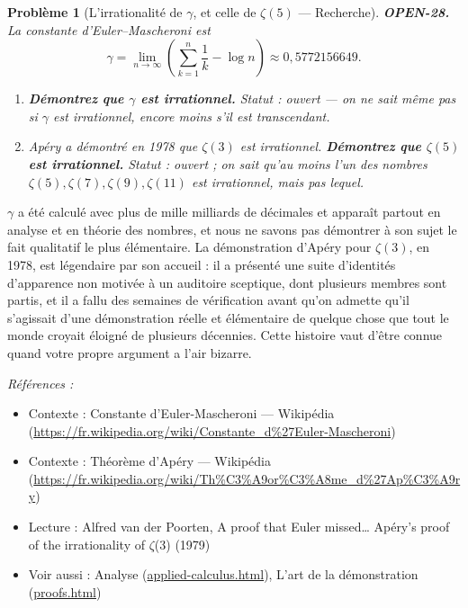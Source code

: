\documentclass[11pt]{article}
\newtheorem{problem}{Problème}
\newenvironment{refs}{\par\small\noindent\emph{Références :}\begin{itemize}\setlength\itemsep{0pt}}{\end{itemize}\normalsize}
\begin{document}
\bigskip

\begin{problem}[{L'irrationalité de $ \gamma $, et celle de $ \zeta(5) $ --- Recherche}]
\textbf{OPEN-28.} La constante d'Euler--Mascheroni est
\[ \gamma = \lim_{n \to \infty}\left( \sum_{k=1}^{n} \frac{1}{k} - \log n \right) \approx 0{,}5772156649 . \]
\begin{enumerate}
\item[(a)] \textbf{Démontrez que $ \gamma $ est irrationnel.} Statut : ouvert --- on ne sait même
pas si $ \gamma $ est irrationnel, encore moins s'il est transcendant.
\item[(b)] Apéry a démontré en 1978 que $ \zeta(3) $ est irrationnel. \textbf{Démontrez que
$ \zeta(5) $ est irrationnel.} Statut : ouvert ; on sait qu'au moins l'un des nombres
$ \zeta(5), \zeta(7), \zeta(9), \zeta(11) $ est irrationnel, mais pas lequel.
\end{enumerate}

\end{problem}

\noindent $ \gamma $ a été calculé avec plus de mille milliards de décimales et
apparaît partout en analyse et en théorie des nombres, et nous ne savons pas démontrer à
son sujet le fait qualitatif le plus élémentaire. La démonstration d'Apéry pour
$ \zeta(3) $, en 1978, est légendaire par son accueil : il a présenté une suite
d'identités d'apparence non motivée à un auditoire sceptique, dont plusieurs membres sont
partis, et il a fallu des semaines de vérification avant qu'on admette qu'il s'agissait
d'une démonstration réelle et élémentaire de quelque chose que tout le monde croyait
éloigné de plusieurs décennies. Cette histoire vaut d'être connue quand votre propre
argument a l'air bizarre.

\begin{refs}
\item Contexte : Constante d'Euler-Mascheroni --- Wikipédia (\url{https://fr.wikipedia.org/wiki/Constante_d%27Euler-Mascheroni})
\item Contexte : Théorème d'Apéry --- Wikipédia (\url{https://fr.wikipedia.org/wiki/Th%C3%A9or%C3%A8me_d%27Ap%C3%A9ry})
\item Lecture : Alfred van der Poorten, \og{} A proof that Euler missed\dots{} Apéry's proof of the irrationality of $\zeta$(3) \fg{} (1979)
\item Voir aussi : Analyse (\url{applied-calculus.html}), L'art de la démonstration (\url{proofs.html})
\end{refs}
\end{document}
